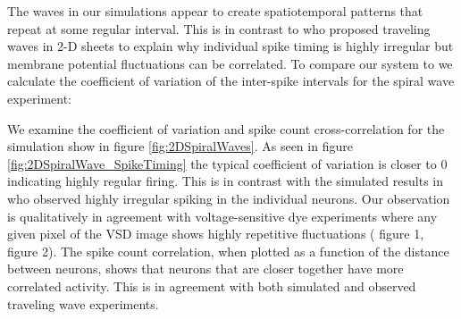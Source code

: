 \documentclass[12pt]{article}
\begin{document}
The waves in our simulations appear to create spatiotemporal patterns that repeat at some regular interval.
This is in contrast to \parencite{keane2015} who proposed traveling waves in 2-D sheets to explain why individual spike timing is highly irregular 
but membrane potential fluctuations can be correlated.
To compare our system to \parencite{keane2015} we calculate the coefficient of variation of the inter-spike intervals for the spiral wave experiment:

We examine the coefficient of variation and spike count cross-correlation for the simulation show in figure \ref{fig:2DSpiralWaves}.
As seen in figure \ref{fig:2DSpiralWave_SpikeTiming} the typical coefficient of variation is closer to 0 indicating highly regular firing.
This is in contrast with the simulated results in \parencite{keane2015} who observed highly irregular spiking in the individual neurons.
Our observation is qualitatively in agreement with voltage-sensitive dye experiments where any given pixel of the VSD image shows highly repetitive fluctuations (\parencite{Huang2010} figure 1, \parencite{huang2004} figure 2). 
The spike count correlation, when plotted as a function of the distance between neurons, shows that neurons that are closer together have more correlated activity.
This is in agreement with both simulated and observed traveling wave experiments.
\end{document}
